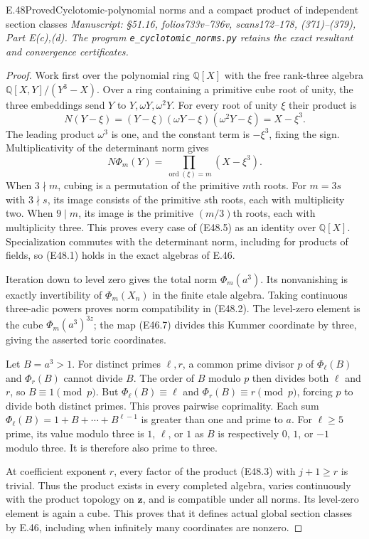 \begin{statement}{E.48}{Proved}{Cyclotomic-polynomial norms and a compact product of independent section classes}
\emph{Manuscript: \S51.16, folios733v--736v,
scans172--178, (371)--(379), Part E(c),(d).
The program \texttt{e\_cyclotomic\_norms.py} retains
the exact resultant and convergence certificates.}
\end{statement}
\begin{proof}
Work first over the polynomial ring $\mathbb Q[X]$
with the free rank-three algebra
$\mathbb Q[X,Y]/(Y^3-X)$. Over a ring containing
a primitive cube root of unity, the three embeddings
send $Y$ to $Y,\omega Y,\omega^2Y$. For every
root of unity $\xi$ their product is
\[
          N(Y-\xi)
          =(Y-\xi)(\omega Y-\xi)(\omega^2Y-\xi)
          =X-\xi^3.
 \tag{E48.6}
\]
The leading product $\omega^3$ is one, and the
constant term is $-\xi^3$, fixing the sign.
Multiplicativity of the determinant norm gives
\[
       N\Phi_m(Y)
          =\prod_{\operatorname{ord}(\xi)=m}(X-\xi^3).
 \tag{E48.7}
\]
When $3\nmid m$, cubing is a permutation of the
primitive $m$th roots. For $m=3s$ with $3\nmid s$,
its image consists of the primitive $s$th roots,
each with multiplicity two. When $9\mid m$, its
image is the primitive $(m/3)$th roots, each with
multiplicity three. This proves every case of
(E48.5) as an identity over $\mathbb Q[X]$.
Specialization commutes with the determinant norm,
including for products of fields, so (E48.1)
holds in the exact algebras of E.46.

Iteration down to level zero gives the total norm
$\Phi_m(a^3)$. Its nonvanishing is exactly
invertibility of $\Phi_m(X_n)$ in the finite
etale algebra. Taking continuous three-adic
powers proves norm compatibility in (E48.2).
The level-zero element is the cube
$\Phi_m(a^3)^{3z}$; the map (E46.7) divides
this Kummer coordinate by three, giving the
asserted toric coordinates.

Let $B=a^3>1$. For distinct primes $\ell,r$,
a common prime divisor $p$ of $\Phi_\ell(B)$
and $\Phi_r(B)$ cannot divide $B$. The order
of $B$ modulo $p$ then divides both $\ell$
and $r$, so $B\equiv1\pmod p$. But
$\Phi_\ell(B)\equiv\ell$ and
$\Phi_r(B)\equiv r\pmod p$, forcing $p$
to divide both distinct primes. This proves
pairwise coprimality. Each sum
$\Phi_\ell(B)=1+B+\cdots+B^{\ell-1}$
is greater than one and prime to $a$.
For $\ell\ge5$ prime, its value modulo three
is $1$, $\ell$, or $1$ as $B$ is respectively
$0$, $1$, or $-1$ modulo three. It is
therefore also prime to three.

At coefficient exponent $r$, every factor
of the product (E48.3) with $j+1\ge r$
is trivial. Thus the product exists in
every completed algebra, varies continuously
with the product topology on $\mathbf z$,
and is compatible under all norms. Its
level-zero element is again a cube.
This proves that it defines actual global
section classes by E.46, including when
infinitely many coordinates are nonzero.


\end{proof}
